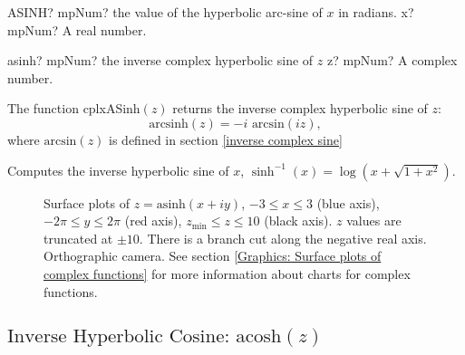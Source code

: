 \begin{mpFunctionsExtract}
	\mpWorksheetFunctionOneNotImplemented
	{ASINH? mpNum? the value of the hyperbolic arc-sine  of $x$ in radians.}
	{x? mpNum? A real number.}
\end{mpFunctionsExtract}

\vspace{0.6cm}


\begin{mpFunctionsExtract}
	\mpFunctionOne
	{asinh? mpNum? the inverse complex hyperbolic sine of $z$}
	{z? mpNum? A complex number.}
\end{mpFunctionsExtract}

\vspace{0.3cm}
The function \textsf{cplxASinh$(z)$} returns the inverse complex hyperbolic sine of $z$: 
\begin{equation}
	\text{arcsinh}(z) = -i \text{ arcsin}(iz),
\end{equation}
where $\text{arcsin}(z)$ is defined in section \ref{inverse complex sine}

Computes the inverse hyperbolic sine of $x$, $\sinh^{-1}(x)=\log(x+\sqrt{1+x^2})$.


\begin{figure}[ht]%
	\centering
	\qquad
	\caption[Complex Inverse Hyperbolic Sine]{Surface plots of $z = \text{asinh}(x + iy)$, $-3 \leq x \leq 3$ (blue axis), $-2 \pi \leq y \leq 2\pi$ (red axis), $z_{\text{min}} \leq z \leq 10$ (black axis). $z$ values are truncated at $\pm 10$. There is a branch cut along the negative real axis. Orthographic camera. See section \ref{Graphics: Surface plots of complex functions} for more information about charts for complex functions.} 
	\label{fig:Complex Inverse Hyperbolic Sine}%
\end{figure}




\newpage
\subsection{\texorpdfstring{$\text{Inverse Hyperbolic Cosine: acosh}(z)$}{acosh}}

